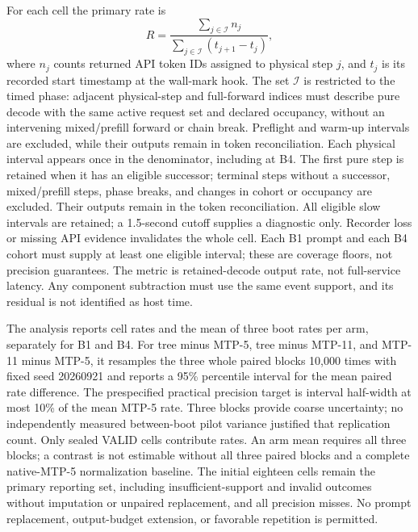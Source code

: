 For each cell the primary rate is
\begin{equation}
 R = \frac{\sum_{j\in\mathcal{I}} n_j}
 {\sum_{j\in\mathcal{I}}(t_{j+1}-t_j)},
\end{equation}
where $n_j$ counts returned API token IDs assigned to physical step $j$, and $t_j$ is its recorded start timestamp at the wall-mark hook. The set $\mathcal{I}$ is restricted to the timed phase: adjacent physical-step and full-forward indices must describe pure decode with the same active request set and declared occupancy, without an intervening mixed/prefill forward or chain break. Preflight and warm-up intervals are excluded, while their outputs remain in token reconciliation. Each physical interval appears once in the denominator, including at B4. The first pure step is retained when it has an eligible successor; terminal steps without a successor, mixed/prefill steps, phase breaks, and changes in cohort or occupancy are excluded. Their outputs remain in the token reconciliation. All eligible slow intervals are retained; a 1.5-second cutoff supplies a diagnostic only. Recorder loss or missing API evidence invalidates the whole cell. Each B1 prompt and each B4 cohort must supply at least one eligible interval; these are coverage floors, not precision guarantees. The metric is retained-decode output rate, not full-service latency. Any component subtraction must use the same event support, and its residual is not identified as host time.

The analysis reports cell rates and the mean of three boot rates per arm, separately for B1 and B4. For tree minus MTP-5, tree minus MTP-11, and MTP-11 minus MTP-5, it resamples the three whole paired blocks 10,000 times with fixed seed 20260921 and reports a 95\% percentile interval for the mean paired rate difference. The prespecified practical precision target is interval half-width at most 10\% of the mean MTP-5 rate. Three blocks provide coarse uncertainty; no independently measured between-boot pilot variance justified that replication count. Only sealed VALID cells contribute rates. An arm mean requires all three blocks; a contrast is not estimable without all three paired blocks and a complete native-MTP-5 normalization baseline. The initial eighteen cells remain the primary reporting set, including insufficient-support and invalid outcomes without imputation or unpaired replacement, and all precision misses. No prompt replacement, output-budget extension, or favorable repetition is permitted.


